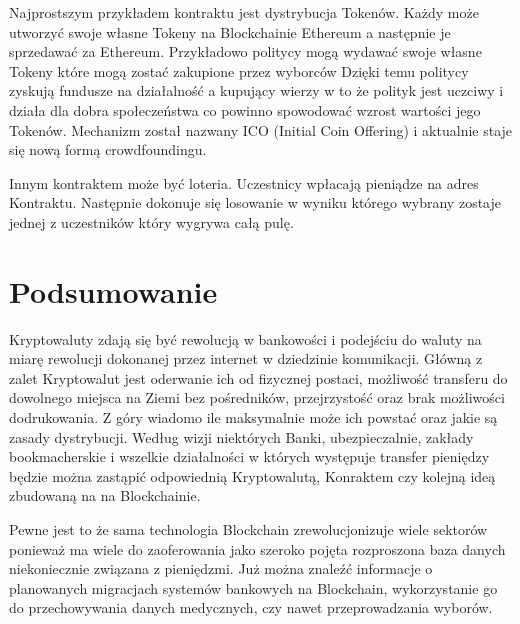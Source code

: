 \documentclass[conference]{IEEEtran}
\begin{document}
Najprostszym przykładem kontraktu jest dystrybucja Tokenów. Każdy może utworzyć swoje własne Tokeny na Blockchainie
Ethereum a następnie je sprzedawać za Ethereum. Przykładowo politycy mogą wydawać swoje własne Tokeny które mogą zostać
zakupione przez wyborców Dzięki temu politycy zyskują fundusze na działalność a kupujący wierzy w to że polityk jest
uczciwy i działa dla dobra społeczeństwa co powinno spowodować wzrost wartości jego Tokenów. Mechanizm został nazwany
ICO (Initial Coin Offering) i aktualnie staje się nową formą crowdfoundingu.

Innym kontraktem może być loteria. Uczestnicy wpłacają pieniądze na adres Kontraktu. Następnie dokonuje się losowanie w
wyniku którego wybrany zostaje jednej z uczestników który wygrywa całą pulę.

\section*{Podsumowanie}

Kryptowaluty zdają się być rewolucją w bankowości i podejściu do waluty na miarę rewolucji dokonanej przez internet w
dziedzinie komunikacji. Główną z zalet Kryptowalut jest oderwanie ich od fizycznej postaci, możliwość transferu do
dowolnego miejsca na Ziemi bez pośredników, przejrzystość oraz brak możliwości dodrukowania. Z góry wiadomo ile
maksymalnie może ich powstać oraz jakie są zasady dystrybucji. Według wizji niektórych Banki, ubezpieczalnie, zakłady
bookmacherskie i wszelkie działalności w których występuje transfer pieniędzy będzie można zastąpić odpowiednią
Kryptowalutą, Konraktem czy kolejną ideą zbudowaną na na Blockchainie.

Pewne jest to że sama technologia Blockchain zrewolucjonizuje wiele sektorów ponieważ ma wiele do zaoferowania jako
szeroko pojęta rozproszona baza danych niekoniecznie związana z pieniędzmi. Już można znaleźć informacje o planowanych
migracjach systemów bankowych na Blockchain, wykorzystanie go do przechowywania danych medycznych, czy nawet
przeprowadzania wyborów.

%
%
\end{document}
